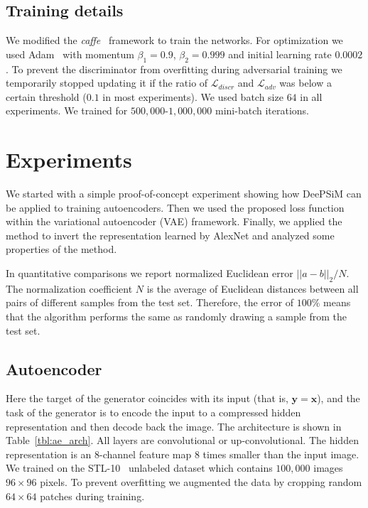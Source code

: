 \documentclass{article}
\newcommand{\ourapproach}{DeePSiM }
\newcommand{\inp}{\mathbf{x}}
\newcommand{\targ}{\mathbf{y}}
\newcommand{\loss}{\mathcal{L}}
\newcommand{\ltwo}{SE }
\newcommand{\discrloss}{\loss_{adv}}
\begin{document}
\subsection{Training details}

We modified the \emph{caffe}~\citep{caffe} framework to train the networks.
For optimization we used Adam~\citep{Kingma_ICLR2015} with momentum $\beta_1=0.9$, $\beta_2=0.999$ and initial learning rate $0.0002$.
To prevent the discriminator from overfitting during adversarial training we temporarily stopped updating it if the ratio of $\mathcal{L}_{discr}$ and $\discrloss$ was below a certain threshold ($0.1$ in most experiments). 
We used batch size $64$ in all experiments. 
We trained for $500,000$-$1,000,000$ mini-batch iterations.

\section{Experiments}
We started with a simple proof-of-concept experiment showing how \ourapproach can be applied to training autoencoders.
Then we used the proposed loss function within the variational autoencoder (VAE) framework.
Finally, we applied the method to invert the representation learned by AlexNet and analyzed some properties of the method.

In quantitative comparisons we report normalized Euclidean error $||a-b||_2 / N$.
The normalization coefficient $N$ is the average of Euclidean distances between all pairs of different samples from the test set.
Therefore, the error of $100 \%$ means that the algorithm performs the same as randomly drawing a sample from the test set.

\subsection{Autoencoder} \label{sec:exp_ae}

Here the target of the generator coincides with its input (that is, $\targ = \inp$), and the task of the generator is to encode the input to a compressed hidden representation and then decode back the image. 
The architecture is shown in Table~\ref{tbl:ae_arch}.
All layers are convolutional or up-convolutional.
The hidden representation is an $8$-channel feature map $8$ times smaller than the input image.
We trained on the STL-10~\citep{Coates_AISTATS2010} unlabeled dataset which contains $100,000$ images $96 \times 96$ pixels.
To prevent overfitting we augmented the data by cropping random $64 \times 64$ patches during training.
\end{document}
